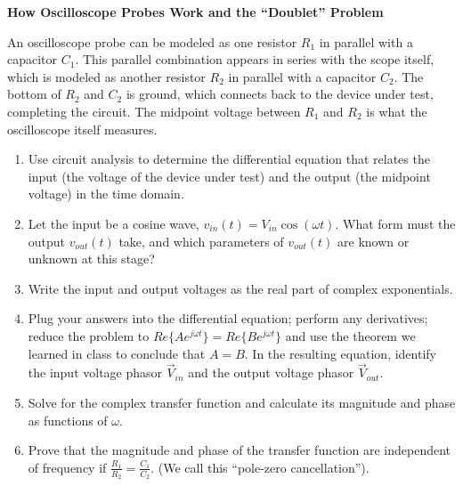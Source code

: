 \documentclass[11pt]{article}
\begin{document}
\pagebreak

\begin{problem}

\textbf{How Oscilloscope Probes Work and the ``Doublet'' Problem}

An oscilloscope probe can be modeled as one resistor $R_1$ in parallel with a capacitor $C_1$. This parallel
combination appears in series with the scope itself, which is modeled as another resistor $R_2$ in parallel
with a capacitor $C_2$. The bottom of $R_2$ and $C_2$ is ground, which connects back to the device under test,
completing the circuit. The midpoint voltage between $R_1$ and $R_2$ is what the oscilloscope itself
measures.

\begin{enumerate}[\alph*)]

\item

Use circuit analysis to determine the differential equation that relates the input (the voltage of
the device under test) and the output (the midpoint voltage) in the time domain.

\item

Let the input be a cosine wave, $v _{in}(t) = V _{in} \cos(\omega t)$. What form must the output $v _{out}(t)$ take,
and which parameters of $v _{out}(t)$ are known or unknown at this stage?

\item

Write the input and output voltages as the real part of complex exponentials.

\item

Plug your answers into the differential equation; perform any derivatives; reduce the problem
to $Re\{ A e ^{j \omega t} \} = Re\{ B e ^{j \omega t} \}$ and use the theorem we learned in class to conclude that $A = B$. In
the resulting equation, identify the input voltage phasor $\vec{V} _{in}$ and the output voltage phasor $\vec{V} _{out}$.

\item

Solve for the complex transfer function and calculate its magnitude and phase as functions of $\omega$.

\item

Prove that the magnitude and phase of the transfer function are independent of frequency if $\frac{R_1}{R_2} = \frac{C_1}{C_2}$.
(We call this ``pole-zero cancellation'').


\end{enumerate}
\end{problem}
\end{document}
